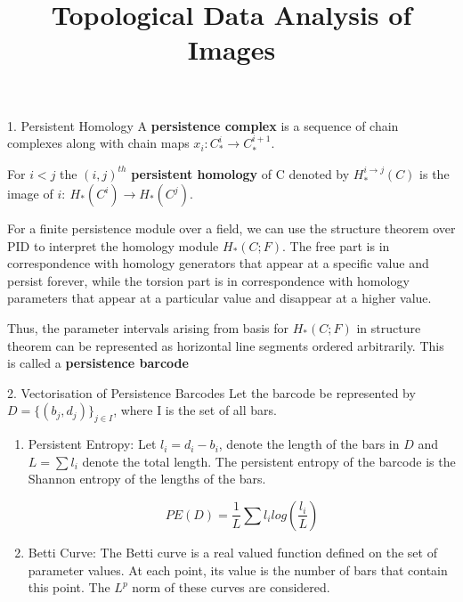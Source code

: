 \documentclass{beamer}
\begin{document}
\title{Topological Data Analysis of Images}


\begin{frame}
\titlepage
\end{frame}


\begin{frame}{1. Persistent Homology}
A \textbf{persistence complex} is a sequence of 
chain complexes along with chain maps $x_i : C_*^i \longrightarrow 
C_*^{i+1}$. \break

For $i<j$ the $(i,j)^{th}$ \textbf{persistent homology} of C 
denoted by $H_*^{i \rightarrow j}(C)$ is the image of $i: \ 
H_*(C^i) \longrightarrow H_*(C^j)$.\break

For a finite persistence module over a field, we can use the 
structure theorem over PID to interpret the homology module 
$H_*(C;F)$. The free part is in correspondence with homology 
generators that appear at a specific value and 
persist forever, while the torsion part is in correspondence 
with homology parameters that appear at a particular value and 
disappear at a higher value. \break

Thus, the parameter intervals arising from basis for $H_*(C;F)
$ in structure theorem can be represented as horizontal line segments ordered arbitrarily. This is called a \textbf{persistence barcode} \break
\end{frame}


\begin{frame}{2. Vectorisation of Persistence Barcodes}
Let the barcode be represented by $D = \{(b_j,d_j)\}_{j \in I}$, where I is the set of all bars.


\begin{enumerate}
\item Persistent Entropy: Let $l_i = d_i - b_i$, denote the length of the bars in $D$ and $L = \sum l_i$ denote the total length. The persistent entropy of the barcode is the Shannon entropy of the lengths of the bars.

\begin{equation}
PE(D) = \frac{1}{L} \sum l_i log(\frac{l_i}{L})
\end{equation}
\item Betti Curve: The Betti curve is a real valued function defined on the set of parameter values. At each point, its  value is the number of bars that contain this point. The $L^p$ norm of these curves are considered.
\end{enumerate}
\end{frame}
\end{document}
